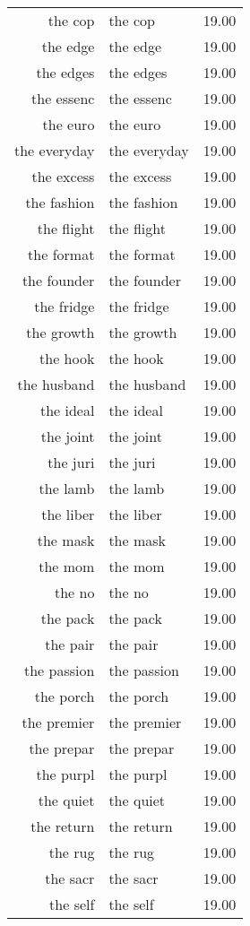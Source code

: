 \begin{table}[ht]
\begin{tabular}{rlr}
  the cop & the cop & 19.00 \\ 
  the edge & the edge & 19.00 \\ 
  the edges & the edges & 19.00 \\ 
  the essenc & the essenc & 19.00 \\ 
  the euro & the euro & 19.00 \\ 
  the everyday & the everyday & 19.00 \\ 
  the excess & the excess & 19.00 \\ 
  the fashion & the fashion & 19.00 \\ 
  the flight & the flight & 19.00 \\ 
  the format & the format & 19.00 \\ 
  the founder & the founder & 19.00 \\ 
  the fridge & the fridge & 19.00 \\ 
  the growth & the growth & 19.00 \\ 
  the hook & the hook & 19.00 \\ 
  the husband & the husband & 19.00 \\ 
  the ideal & the ideal & 19.00 \\ 
  the joint & the joint & 19.00 \\ 
  the juri & the juri & 19.00 \\ 
  the lamb & the lamb & 19.00 \\ 
  the liber & the liber & 19.00 \\ 
  the mask & the mask & 19.00 \\ 
  the mom & the mom & 19.00 \\ 
  the no & the no & 19.00 \\ 
  the pack & the pack & 19.00 \\ 
  the pair & the pair & 19.00 \\ 
  the passion & the passion & 19.00 \\ 
  the porch & the porch & 19.00 \\ 
  the premier & the premier & 19.00 \\ 
  the prepar & the prepar & 19.00 \\ 
  the purpl & the purpl & 19.00 \\ 
  the quiet & the quiet & 19.00 \\ 
  the return & the return & 19.00 \\ 
  the rug & the rug & 19.00 \\ 
  the sacr & the sacr & 19.00 \\ 
  the self & the self & 19.00 \\ 

\end{tabular}
\end{table}
